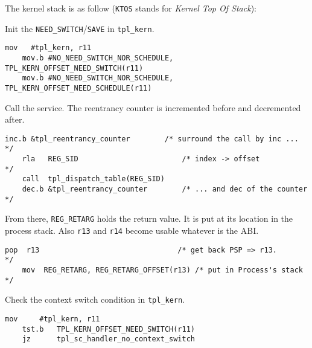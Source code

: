 \documentclass[11pt, oneside]{article}   	%
\begin{document}
The kernel stack is as follow (\texttt{KTOS} stands for \emph{Kernel Top Of Stack}):

\begin{center}
\end{center}

Init the \lstinline{NEED_SWITCH}/\lstinline{SAVE} in \lstinline{tpl_kern}.

\begin{lstlisting}[backgroundcolor=\color{red!15}]
    mov   #tpl_kern, r11
    mov.b #NO_NEED_SWITCH_NOR_SCHEDULE, TPL_KERN_OFFSET_NEED_SWITCH(r11)
    mov.b #NO_NEED_SWITCH_NOR_SCHEDULE, TPL_KERN_OFFSET_NEED_SCHEDULE(r11)
\end{lstlisting}

Call the service. The reentrancy counter is incremented before and decremented after.
 
\begin{lstlisting}[backgroundcolor=\color{red!15}]
    inc.b &tpl_reentrancy_counter        /* surround the call by inc ...  */
    rla   REG_SID                        /* index -> offset               */
    call  tpl_dispatch_table(REG_SID)
    dec.b &tpl_reentrancy_counter        /* ... and dec of the counter    */
\end{lstlisting}

From there, \lstinline{REG_RETARG} holds the return value. It is put at its location in the process stack. Also \lstinline{r13} and \lstinline{r14} become usable whatever is the ABI.

\begin{lstlisting}[backgroundcolor=\color{red!15}]
    pop  r13                                /* get back PSP => r13.       */
    mov  REG_RETARG, REG_RETARG_OFFSET(r13) /* put in Process's stack     */
\end{lstlisting}

Check the context switch condition in \lstinline{tpl_kern}.
\begin{lstlisting}[backgroundcolor=\color{red!15}]
    mov     #tpl_kern, r11
    tst.b   TPL_KERN_OFFSET_NEED_SWITCH(r11)
    jz      tpl_sc_handler_no_context_switch
\end{lstlisting}
\end{document}
